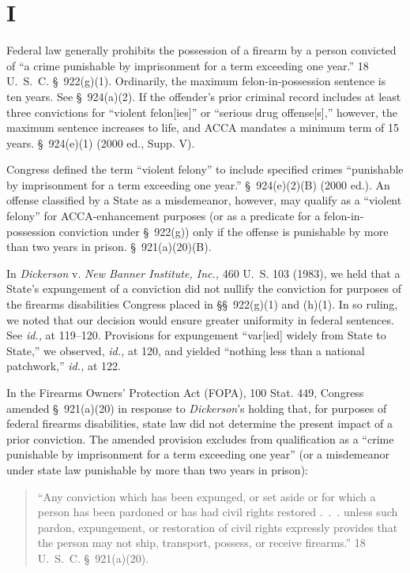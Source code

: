 \section{I}

  Federal law generally prohibits the possession of a firearm by a person convicted of ``a crime punishable by imprisonment for a term exceeding one year.'' 18 U.~S.~C. \S~922(g)(1). Ordinarily, the maximum felon-in-possession sentence is ten years. See \S~924(a)(2). If the offender's prior criminal record includes at least three convictions for ``violent felon[ies]'' or ``serious drug offense[s],'' however, the maximum sentence increases to life, and ACCA mandates a minimum term of 15 years. \S~924(e)(1) (2000 ed., Supp. V).

  Congress defined the term ``violent felony'' to include specified crimes ``punishable by imprisonment for a term exceeding one year.'' \S~924(e)(2)(B) (2000 ed.). An offense classified by a State as a misdemeanor, however, may qualify as a ``violent felony'' for ACCA-enhancement purposes (or as a predicate for a felon-in-possession conviction under \S~922(g)) only if the offense is punishable by more than two years in prison. \S~921(a)(20)(B).

  In \emph{Dickerson} v. \emph{New Banner Institute, Inc.,} 460 U.~S. 103 (1983), we held that a State's expungement of a conviction did not nullify the conviction for purposes of the firearms disabilities Congress placed in \S\S~922(g)(1) and (h)(1). In so ruling, we noted that our decision would ensure greater uniformity in federal sentences. See \emph{id.,} at 119--120. Provisions for expungement ``var[ied] widely from State to State,'' we observed, \emph{id.,} at 120, and yielded ``nothing less than a national patchwork,'' \emph{id.,} at 122.

  In the Firearms Owners' Protection Act (FOPA), 100 Stat. 449, Congress amended \S~921(a)(20) in response to \emph{Dickerson}'s holding that, for purposes of federal firearms disabilities, state law did not determine the present impact of a \newpage  prior conviction. The amended provision excludes from qualification as a ``crime punishable by imprisonment for a term exceeding one year'' (or a misdemeanor under state law punishable by more than two years in prison):

    \begin{quote}

		``Any conviction which has been expunged, or set aside or for which a person has been pardoned or has had civil rights restored .~.~. unless such pardon, expungement, or restoration of civil rights expressly provides that the person may not ship, transport, possess, or receive firearms.'' 18 U.~S.~C. \S~921(a)(20).\footnotemark[1]

    \end{quote}

